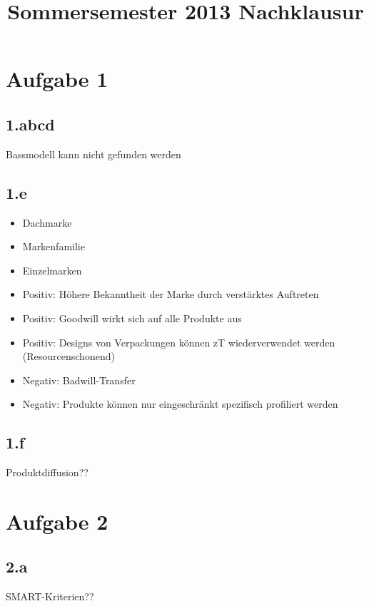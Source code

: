 

\title{Sommersemester 2013 Nachklausur}
\maketitle


\section{Aufgabe 1}
\subsection{1.abcd}
    Bassmodell kann nicht gefunden werden

\subsection{1.e}
    \begin{itemize}
        \item Dachmarke
        \item Markenfamilie
        \item Einzelmarken
    \end{itemize}

    \begin{itemize}
        \item Positiv: Höhere Bekanntheit der Marke durch verstärktes Auftreten
        \item Positiv: Goodwill wirkt sich auf alle Produkte aus
        \item Positiv: Designs von Verpackungen können zT wiederverwendet werden (Resourcenschonend)
        \item Negativ: Badwill-Transfer
        \item Negativ: Produkte können nur eingeschränkt spezifisch profiliert werden
    \end{itemize}

\subsection{1.f}
    Produktdiffusion??

\section{Aufgabe 2}
\subsection{2.a}
    SMART-Kriterien??

